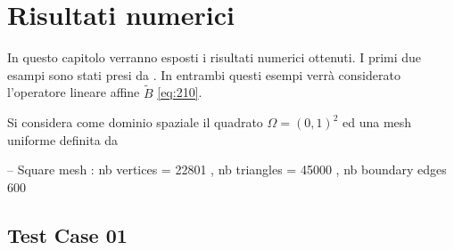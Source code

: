 \section{Risultati numerici}
\label{chap:Results}
In questo capitolo verranno esposti i risultati numerici ottenuti.
I primi due esampi sono stati presi da \cite{MAIN}.
In entrambi questi esempi verrà considerato l'operatore lineare affine $\tilde{B}$ \ref{eq:210}.
\par
Si considera come dominio spaziale il quadrato $ \Omega = (0,1)^2$ ed una mesh uniforme definita da
\begin{Code}[caption={mesh in spazio square( 150, 150, flags=1 )}]
-- Square mesh : nb vertices  = 22801 ,  nb triangles = 45000 ,  nb boundary edges 600
\end{Code}

\subsection{Test Case 01}
